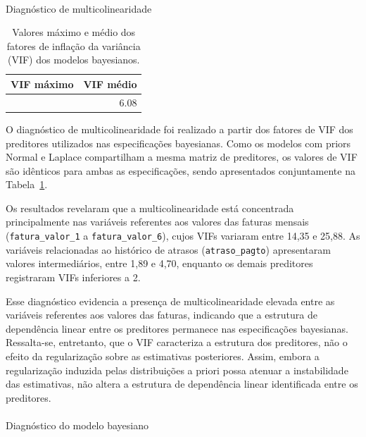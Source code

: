 \documentclass[
  brazilian,
  12pt,
  letterpaper,
  DIV=11,
  numbers=noendperiod]{scrartcl}
\makeatletter
\let\oldparagraph\paragraph
\renewcommand{\paragraph}{
    \@ifstar
      \xxxParagraphStar
      \xxxParagraphNoStar
  }
\newcommand{\xxxParagraphStar}[1]{\oldparagraph*{#1}\mbox{}}
\newcommand{\xxxParagraphNoStar}[1]{\oldparagraph{#1}\mbox{}}
\makeatother
\begin{document}
\paragraph{Diagnóstico de
multicolinearidade}\label{diagnuxf3stico-de-multicolinearidade-1}

{

\begin{longtable}[]{@{}rr@{}}

\caption{\label{tbl-vif-bayes}Valores máximo e médio dos fatores de
inflação da variância (VIF) dos modelos bayesianos.}

\tabularnewline

\toprule\noalign{}
VIF máximo & VIF médio \\
\midrule\noalign{}
\endhead
\bottomrule\noalign{}
\endlastfoot
25.88 & 6.08 \\

\end{longtable}

}

O diagnóstico de multicolinearidade foi realizado a partir dos fatores
de VIF dos preditores utilizados nas especificações bayesianas. Como os
modelos com priors Normal e Laplace compartilham a mesma matriz de
preditores, os valores de VIF são idênticos para ambas as
especificações, sendo apresentados conjuntamente na
Tabela~\ref{tbl-vif-bayes}.

Os resultados revelaram que a multicolinearidade está concentrada
principalmente nas variáveis referentes aos valores das faturas mensais
(\texttt{fatura\_valor\_1} a \texttt{fatura\_valor\_6}), cujos VIFs
variaram entre 14,35 e 25,88. As variáveis relacionadas ao histórico de
atrasos (\texttt{atraso\_pagto}) apresentaram valores intermediários,
entre 1,89 e 4,70, enquanto os demais preditores registraram VIFs
inferiores a 2.

Esse diagnóstico evidencia a presença de multicolinearidade elevada
entre as variáveis referentes aos valores das faturas, indicando que a
estrutura de dependência linear entre os preditores permanece nas
especificações bayesianas. Ressalta-se, entretanto, que o VIF
caracteriza a estrutura dos preditores, não o efeito da regularização
sobre as estimativas posteriores. Assim, embora a regularização induzida
pelas distribuições a priori possa atenuar a instabilidade das
estimativas, não altera a estrutura de dependência linear identificada
entre os preditores.

\paragraph{Diagnóstico do modelo
bayesiano}\label{diagnuxf3stico-do-modelo-bayesiano}
\end{document}
